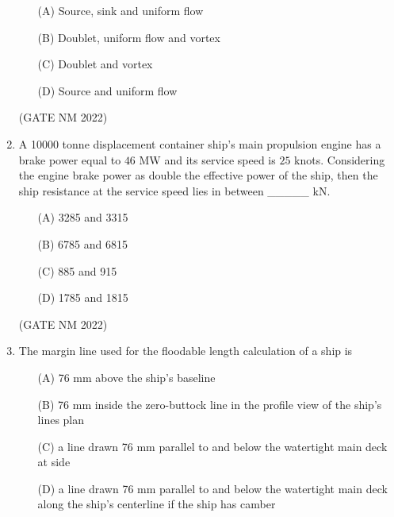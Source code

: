 \documentclass[journal,12pt,onecolumn]{IEEEtran}
\theoremstyle{remark}
\begin{document}
\begin{enumerate}
\begin{enumerate}
    \item[(A)] Source, sink and uniform flow
    \item[(B)] Doublet, uniform flow and vortex
    \item[(C)] Doublet and vortex
    \item[(D)] Source and uniform flow
\end{enumerate}


\hfill(GATE NM 2022)





\item  A 10000 tonne displacement container ship's main propulsion engine has a brake power equal to $46$ MW  and its service speed is $25$ knots. Considering the engine brake power as double the effective power of the ship, then the ship resistance at the service speed lies in between \_\_\_\_\_  kN.

	\begin{multicols}{2}

\begin{enumerate}
    \item[(A)] 3285 and 3315
    \item[(B)] 6785 and 6815
    \item[(C)] 885 and 915
    \item[(D)] 1785 and 1815
\end{enumerate}

	\end{multicols}

\hfill (GATE NM 2022)







\item  The margin line used for the floodable length calculation of a ship is

\begin{enumerate}
    \item[(A)] 76 mm above the ship's baseline
    \item[(B)] 76 mm inside the zero-buttock line in the profile view of the ship's lines plan
    \item[(C)] a line drawn 76 mm parallel to and below the watertight main deck at side
    \item[(D)] a line drawn 76 mm parallel to and below the watertight main deck along the ship's centerline if the ship has camber
\end{enumerate}


\end{enumerate}
\end{document}
